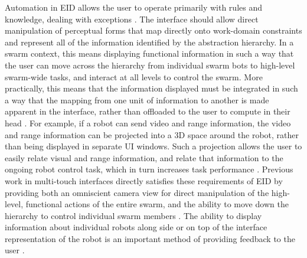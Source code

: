 \documentclass[]{article}
\begin{document}
Automation in EID allows the user to operate primarily with rules and knowledge, dealing with exceptions \cite{vicente2002ecological}.
The interface should allow direct manipulation of perceptual forms that map directly onto work-domain constraints and represent all of the information identified by the abstraction hierarchy. 
In a swarm context, this means displaying functional information in such a way that the user can move across the hierarchy from individual swarm bots to high-level swarm-wide tasks, and interact at all levels to control the swarm. 
More practically, this means that the information displayed must be integrated in such a way that the mapping from one unit of information to another is made apparent in the interface, rather than offloaded to the user to compute in their head \cite{yanco2004beyond}. 
For example, if a robot can send video and range information, the video and range information can be projected into a 3D space around the robot, rather than being displayed in separate UI windows.
Such a projection allows the user to easily relate visual and range information, and relate that information to the ongoing robot control task, which in turn increases task performance \cite{ricks2004ecological}.
Previous work in multi-touch interfaces directly satisfies these requirements of EID by providing both an omniscient camera view for direct manipulation of the high-level, functional actions of the entire swarm, and the ability to move down the hierarchy to control individual swarm members \cite{Micire:2009:ANG:1731903.1731912}.
The ability to display information about individual robots along side or on top of the interface representation of the robot is an important method of providing feedback to the user \cite{Kato:2009:MIC:1520340.1520500}. 
\end{document}
